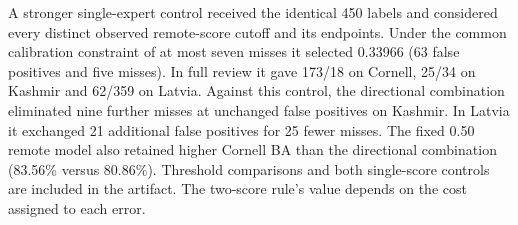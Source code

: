 A stronger single-expert control received the identical 450 labels and considered every distinct observed remote-score cutoff and its endpoints. Under the common calibration constraint of at most seven misses it selected 0.33966 (63 false positives and five misses). In full review it gave 173/18 on Cornell, 25/34 on Kashmir and 62/359 on Latvia. Against this control, the directional combination eliminated nine further misses at unchanged false positives on Kashmir. In Latvia it exchanged 21 additional false positives for 25 fewer misses. The fixed 0.50 remote model also retained higher Cornell BA than the directional combination (83.56\% versus 80.86\%). Threshold comparisons and both single-score controls are included in the artifact. The two-score rule's value depends on the cost assigned to each error.
